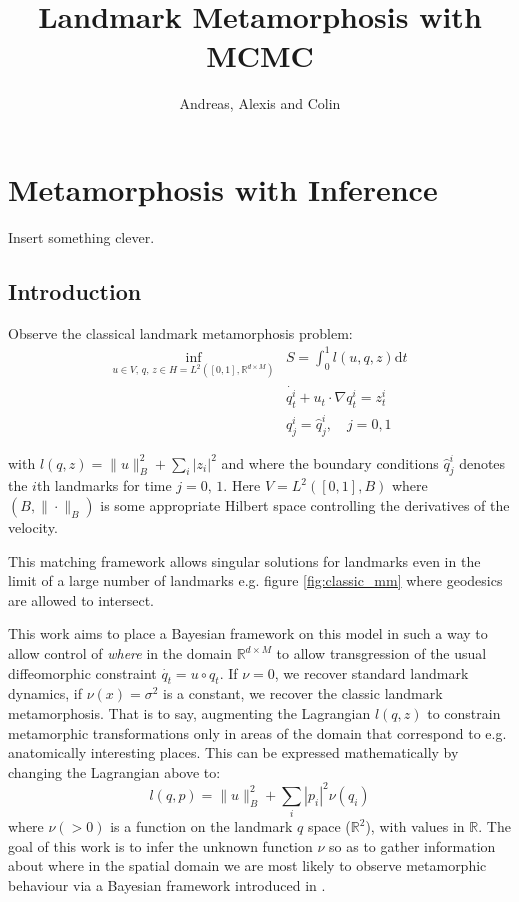 \documentclass{article}
\newcommand{\norm}[2]{\| #1 \|_{ #2 }}
\newcommand{\bnorm}[1]{\norm{ #1 }{B}}
\newcommand{\diff}[1]{\text{d} #1}
\newcommand{\RdM}{\mathbb{R}^{d\times M}}
\begin{document}
\title{Landmark Metamorphosis with MCMC}
\author{Andreas, Alexis and Colin}
\maketitle

\section{Metamorphosis with Inference}

Insert something clever.

\subsection{Introduction}

Observe the classical landmark metamorphosis problem: 
\begin{subequations}
\begin{align}
\inf_{u\in V,\,q,\, z \in H=L^2([0,1],\RdM)} & S = \int_0^1 l(u, q,
z)\diff{t}\label{nu_fnl}\\
            & \dot{q^i_t} + u_t \cdot \nabla q^i_t = z^i_t \\
            & q^i_j = \hat q^i_j, \quad j=0,1
\end{align}
\end{subequations}

with $l(q, z) = \bnorm{u}^2 + \sum_i |z_i|^2$ and where the boundary conditions
$\hat q^i_j$ denotes the $i$th landmarks for time $j=0,\,1$. Here
$V = L^2([0,1], B)$ where $(B,\bnorm{\cdot})$ is some appropriate Hilbert space
controlling the derivatives of the velocity.

This matching framework allows singular solutions for landmarks even in the
limit of a large number of landmarks e.g. figure \ref{fig:classic_mm} where
geodesics are allowed to intersect.


This work aims to place a Bayesian framework on this model in such a way to
allow control of \emph{where} in the domain $\RdM$ to allow transgression of the
usual diffeomorphic constraint $\dot{q_t} = u\circ q_t$. If $\nu=0$, we recover
standard landmark dynamics, if $\nu(x)=\sigma^2$ is a constant, we recover the
classic landmark metamorphosis. That is to say, augmenting the Lagrangian
$l(q,z)$ to constrain metamorphic transformations only in areas of the domain
that correspond to e.g. anatomically interesting places.  This can be expressed
mathematically by changing the Lagrangian above to:
\[
l(q,p) = \bnorm{u}^2 + \sum_i |p_i|^2 \nu(q_i)
\]
where $\nu (>0)$ is a function on the landmark $q$ space ($\mathbb R^2$),
with values in $\mathbb R$. The goal of this work is to infer the unknown
function $\nu$ so as to gather information about where in the spatial domain we
are most likely to observe metamorphic behaviour via a Bayesian framework
introduced in \cite{stuart_something}.
\end{document}
